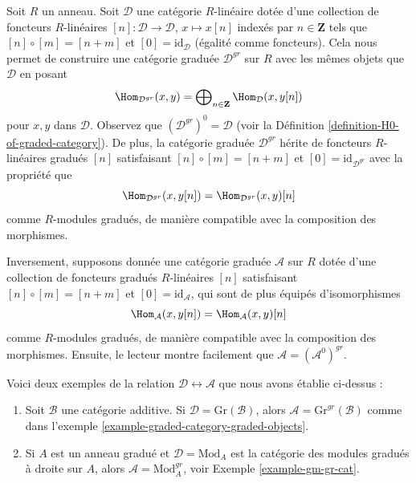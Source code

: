 \begin{remark}
\label{remark-graded-shift-functors}
Soit $R$ un anneau. Soit $\mathcal{D}$ une catégorie $R$-linéaire dotée d'une
collection de foncteurs $R$-linéaires $[n] : \mathcal{D} \to \mathcal{D}$, $x
\mapsto x[n]$ indexés par $n \in \mathbf{Z}$ tels que $[n] \circ [m] = [n + m]$ et
$[0] = \text{id}_\mathcal{D}$ (égalité comme foncteurs). Cela nous permet de
construire une catégorie graduée $\mathcal{D}^{gr}$ sur $R$ avec les mêmes objets
que $\mathcal{D}$ en posant
$$
\Hom_{\mathcal{D}^{gr}}(x, y) =
\bigoplus\nolimits_{n \in \mathbf{Z}} \Hom_\mathcal{D}(x, y[n])
$$
pour $x, y$ dans $\mathcal{D}$. Observez que $(\mathcal{D}^{gr})^0 = \mathcal{D}$
(voir la Définition \ref{definition-H0-of-graded-category}). De plus, la catégorie
graduée $\mathcal{D}^{gr}$ hérite de foncteurs $R$-linéaires gradués $[n]$
satisfaisant $[n] \circ [m] = [n + m]$ et $[0] = \text{id}_{\mathcal{D}^{gr}}$
avec la propriété que
$$
\Hom_{\mathcal{D}^{gr}}(x, y[n]) = \Hom_{\mathcal{D}^{gr}}(x, y)[n]
$$
comme $R$-modules gradués, de manière compatible avec la composition des morphismes.

\medskip\noindent
Inversement, supposons donnée une catégorie graduée $\mathcal{A}$ sur $R$ dotée
d'une collection de foncteurs gradués $R$-linéaires $[n]$ satisfaisant $[n] \circ
[m] = [n + m]$ et $[0] = \text{id}_\mathcal{A}$, qui sont de plus équipés
d'isomorphismes
$$
\Hom_\mathcal{A}(x, y[n]) = \Hom_\mathcal{A}(x, y)[n]
$$
comme $R$-modules gradués, de manière compatible avec la composition des morphismes.
Ensuite, le lecteur montre facilement que $\mathcal{A} = (\mathcal{A}^0)^{gr}$.

\medskip\noindent
Voici deux exemples de la relation $\mathcal{D} \leftrightarrow \mathcal{A}$ que
nous avons établie ci-dessus :
\begin{enumerate}
\item Soit $\mathcal{B}$ une catégorie additive. Si $\mathcal{D} =
\text{Gr}(\mathcal{B})$, alors $\mathcal{A} = \text{Gr}^{gr}(\mathcal{B})$ comme
dans l'exemple \ref{example-graded-category-graded-objects}.
\item Si $A$ est un anneau gradué et $\mathcal{D} = \text{Mod}_A$ est la catégorie
des modules gradués à droite sur $A$, alors $\mathcal{A} = \text{Mod}^{gr}_A$, voir
Exemple \ref{example-gm-gr-cat}.
\end{enumerate}
\end{remark}






